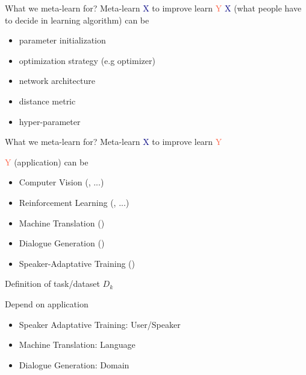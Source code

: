 \documentclass{beamer}
\begin{document}
\begin{frame}[t]{What we meta-learn for?}
  \centering Meta-learn \textcolor{navy}{X} to improve learn \textcolor{tomato}{Y}
  \pause
  \flushleft \textcolor{navy}{X} (what people have to decide in learning algorithm) can be
  \begin{itemize}
    \item parameter initialization
    \item optimization strategy (e.g optimizer)
    \item network architecture
    \item distance metric
    \item hyper-parameter
  \end{itemize}
\end{frame}

\begin{frame}[t]{What we meta-learn for?}
  \centering Meta-learn \textcolor{navy}{X} to improve learn \textcolor{tomato}{Y}

  \flushleft \textcolor{tomato}{Y} (application) can be
  \begin{itemize}
    \item Computer Vision (\citealt{snell2017prototypical}, \citealt{rusu2018meta} ...)
    \item Reinforcement Learning (\citealt{eysenbach2018diversity}, \citealt{xu2018meta} ...)
    \item Machine Translation (\citealt{gu2018meta})
    \item Dialogue Generation (\citealt{mi2019meta})
    \item Speaker-Adaptative Training (\citealt{klejch2019speaker})
  \end{itemize}

\end{frame}

\begin{frame}[t]{Definition of task/dataset $D_k$}
  \begin{center}
    \LARGE{Depend on application}
  \end{center}
    \begin{itemize}
      \item Speaker Adaptative Training: User/Speaker
      \item Machine Translation: Language
      \item Dialogue Generation: Domain
    \end{itemize}
\end{frame}
\end{document}
